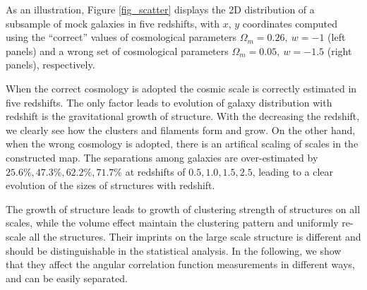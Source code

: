 \documentclass[iop]{emulateapj}
\newcommand{\hMsun}{{\ifmmode{h^{-1}{\rm
        {M_{\odot}}}}\else{$h^{-1}{\rm{M_{\odot}}}$~}\fi}}
\begin{document}
As an illustration, Figure \ref{fig_scatter} displays the 2D distribution of a subsample of mock galaxies in five redshifts,
with $x$, $y$ coordinates computed using the ``correct'' values of cosmological parameters $\Omega_m=0.26,\ w=-1$ (left panels) 
and a wrong set of cosmological parameters $\Omega_m=0.05,\ w=-1.5$ (right panels), respectively.

When the correct cosmology is adopted the cosmic scale is correctly estimated in five redshifts.
The only factor leads to evolution of galaxy distribution with redshift is the gravitational growth of structure.
With the decreasing the redshift, we clearly see how the clusters and filaments form and grow.
On the other hand, when the wrong cosmology is adopted, there is an artifical scaling of scales in the constructed map.
The separations among galaxies are over-estimated by 
$25.6\%,47.3\%,62.2\%,71.7\%$ at redshifts of $0.5,1.0,1.5,2.5$,
leading to a clear evolution of the sizes of structures with redshift.

The growth of structure leads to growth of clustering strength of structures on all scales,
while the volume effect maintain the clustering pattern and uniformly re-scale all the structures.
Their imprints on the large scale structure is different and should be distinguishable in the statistical analysis.
In the following, we show that they affect the angular correlation function measurements in different ways, 
and can be easily separated.




\end{document}

